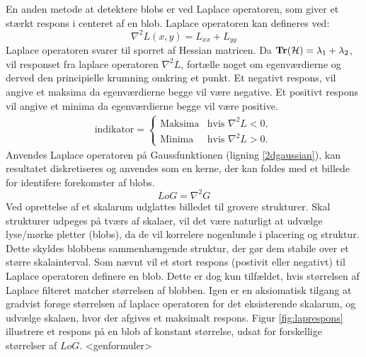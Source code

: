        \vspace{-2.7em}
\noindent
En anden metode at detektere blobs er ved Laplace operatoren, som giver et stærkt respons i centeret af en blob. Laplace operatoren kan defineres ved:
$$
\nabla^2L(x,y) = L_{xx}+L_{yy}
$$
Laplace operatoren svarer til sporret af Hessian matricen. Da $\bold{Tr}(\mathcal{H}) = \lambda_1 + \lambda_2$, vil responset fra laplace operatoren $\nabla^2L$, fortælle noget om egenværdierne og derved den principielle krumning omkring et punkt. Et negativt respons, vil angive et maksima da egenværdierne begge vil være negative. Et positivt respons vil angive et minima da egenværdierne begge vil være positive.
\begin{equation}
\begin{split}
\text{indikator} = 
\begin{cases}
\text{Maksima}& \text{hvis } \nabla^2L < 0,  \\
\text{Minima} & \text{hvis } \nabla^2L > 0.
\end{cases}
\end{split}
\label{laplaceblob}
\end{equation}
Anvendes Laplace operatoren på Gaussfunktionen (ligning \eqref{2dgaussian}), kan resultatet diskretiseres og anvendes som en kerne, der kan foldes med et billede for identifere forekomster af blobs.
\begin{equation}
LoG= \nabla^2 G
\label{lap}
\end{equation}
Ved oprettelse af et skalarum udglattes billedet til grovere strukturer. 
Skal strukturer udpeges på tværs af skalaer, vil det være naturligt at udvælge lyse/mørke pletter (blobs), da de vil korrelere nogenlunde i placering og struktur. Dette skyldes blobbens sammenhængende struktur, der gør dem stabile over et større skalainterval. Som nævnt vil et stort respons (postivit eller negativt) til Laplace operatoren definere en blob. Dette er dog kun tilfældet, hvis størrelsen af Laplace filteret matcher størrelsen af blobben. Igen er en aksiomatisk tilgang at gradvist forøge størrelsen af laplace operatoren for det eksisterende skalarum, og udvælge skalaen, hvor der afgives et maksimalt respons. Figur \ref{fig:laprespons} illustrere et respons på en blob af konstant størrelse, udsat for forskellige størrelser af $LoG$. <genformuler>
